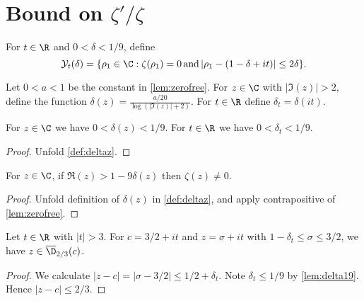 \section{Bound on \texorpdfstring{$\zeta'/\zeta$}{zeta'/zeta}}

\begin{definition} \label{def:Yt} 
\leanok
For $t\in\R$ and $0<\delta<1/9$, define
$$\mathcal{Y}_t(\delta) = \{\rho_1\in\C : \zeta(\rho_1) = 0 \,\text{and} \, |\rho_1-(1-\delta+it)|\le 2\delta\}.$$
\end{definition}

\begin{definition} \label{def:deltaz}  \leanok
Let $0<a<1$ be the constant in \ref{lem:zerofree}. For $z\in\C$ with $|\Im(z)|>2$, define the function $\delta(z) = \frac{a/20}{\log(|\Im(z)|+2)}$. For $t\in\R$ define $\delta_t = \delta(it)$.
\end{definition}

\begin{lemma} \label{lem:delta19}  \leanok
For $z\in\C$ we have $0<\delta(z)<1/9$. For $t\in\R$ we have $0<\delta_t<1/9$.
\end{lemma}
\begin{proof}
\leanok
Unfold \cref{def:deltaz}.
\end{proof}

\begin{lemma} \label{lem:ZFRdelta}  \leanok
For $z\in\C$, if $\Re(z) > 1 - 9\delta(z)$ then $\zeta(z)\neq 0$. \end{lemma}
\begin{proof}
\leanok
Unfold definition of $\delta(z)$ in \cref{def:deltaz}, and apply contrapositive of \cref{lem:zerofree}.
\end{proof}

\begin{lemma} \label{lem:ZFRinD}  \leanok
Let $t\in\R$ with $|t|>3$. For $c=3/2+it$ and $z=\sigma+it$ with $1-\delta_t \le \sigma \le 3/2$, we have $z\in \overline{\D}_{2/3}(c)$.
\end{lemma}
\begin{proof}
\leanok
We calculate $|z-c|= |\sigma - 3/2| \le 1/2 + \delta_t$. Note $\delta_t \le 1/9$ by \cref{lem:delta19}. Hence $|z-c|\le 2/3$.
\end{proof}

